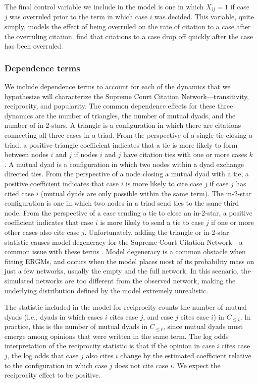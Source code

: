 \documentclass[headsepline=true, abstracton]{scrartcl}
\begin{document}
The final control variable we include in the model is one in which $X_{ij} = 1$ if case $j$ was overruled prior to the term in which case $i$ was decided. This variable, quite simply, models the effect of being overruled on the rate of citation to a case after the overruling citation. \citet{fowler2008authority} find that citations to a case drop off quickly after the case has been overruled.


\subsubsection{Dependence terms}\label{dependence_terms}

We include dependence terms to account for each of the dynamics that we hypothesize will characterize the Supreme Court Citation Network---transitivity, reciprocity, and popularity.  The common dependence effects for these three dynamics are the number of triangles, the number of mutual dyads, and the number of in-2-stars. A triangle is a configuration in which there are citations connecting all three cases in a triad. From the perspective of a single tie closing a triad, a positive triangle coefficient indicates that a tie is more likely to form between nodes $i$ and $j$ if nodes $i$ and $j$ have citation ties with one or more cases $k$. A mutual dyad is a configuration in which two nodes within a dyad exchange directed ties. From the perspective of a node closing a mutual dyad with a tie, a positive coefficient indicates that case $i$ is more likely to cite case $j$ if case $j$ has cited case $i$ (mutual dyads are only possible within the same term). The in-2-star configuration is one in which two nodes in a triad send ties to the same third node. From the perspective of a case sending a tie to close an in-2-star, a positive coefficient indicates that case $i$ is more likely to send a tie to case $j$ if one or more other cases also cite case $j$. Unfortunately, adding the triangle or in-2-star statistic causes model degeneracy for the Supreme Court Citation Network---a common issue with these terms \citep{Handcock.2003}. Model degeneracy is a common obstacle when fitting ERGMs, and occurs when the model places most of its probability mass on just a few networks, usually the empty and the full network. In this scenario, the simulated networks are too different from the observed network, making the underlying distribution defined by the model extremely unrealistic.

The statistic included in the model for reciprocity counts the number of mutual dyads (i.e., dyads in which cases $i$ cites case $j$, and case $j$ cites case $i$) in $C_{\leq t}$. In practice, this is the number of mutual dyads in $C_{\leq t}$, since mutual dyads must emerge among opinions that were written in the same term. The log odds interpretation of the reciprocity statistic is that if the opinion in case $i$ cites case $j$, the log odds that case $j$ also cites $i$ change by the estimated coefficient relative to the configuration in which case $j$ does not cite case $i$. We expect the reciprocity effect to be positive.
\end{document}
